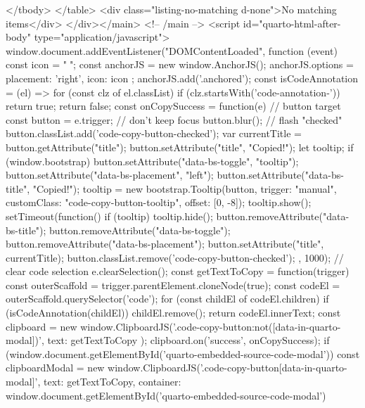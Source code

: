 </tbody>
</table>
<div class="listing-no-matching d-none">No matching items</div>
</div></main> <!-- /main -->
<script id="quarto-html-after-body" type="application/javascript">
  window.document.addEventListener("DOMContentLoaded", function (event) {
    const icon = "";
    const anchorJS = new window.AnchorJS();
    anchorJS.options = {
      placement: 'right',
      icon: icon
    };
    anchorJS.add('.anchored');
    const isCodeAnnotation = (el) => {
      for (const clz of el.classList) {
        if (clz.startsWith('code-annotation-')) {                     
          return true;
        }
      }
      return false;
    }
    const onCopySuccess = function(e) {
      // button target
      const button = e.trigger;
      // don't keep focus
      button.blur();
      // flash "checked"
      button.classList.add('code-copy-button-checked');
      var currentTitle = button.getAttribute("title");
      button.setAttribute("title", "Copied!");
      let tooltip;
      if (window.bootstrap) {
        button.setAttribute("data-bs-toggle", "tooltip");
        button.setAttribute("data-bs-placement", "left");
        button.setAttribute("data-bs-title", "Copied!");
        tooltip = new bootstrap.Tooltip(button, 
          { trigger: "manual", 
            customClass: "code-copy-button-tooltip",
            offset: [0, -8]});
        tooltip.show();    
      }
      setTimeout(function() {
        if (tooltip) {
          tooltip.hide();
          button.removeAttribute("data-bs-title");
          button.removeAttribute("data-bs-toggle");
          button.removeAttribute("data-bs-placement");
        }
        button.setAttribute("title", currentTitle);
        button.classList.remove('code-copy-button-checked');
      }, 1000);
      // clear code selection
      e.clearSelection();
    }
    const getTextToCopy = function(trigger) {
      const outerScaffold = trigger.parentElement.cloneNode(true);
      const codeEl = outerScaffold.querySelector('code');
      for (const childEl of codeEl.children) {
        if (isCodeAnnotation(childEl)) {
          childEl.remove();
        }
      }
      return codeEl.innerText;
    }
    const clipboard = new window.ClipboardJS('.code-copy-button:not([data-in-quarto-modal])', {
      text: getTextToCopy
    });
    clipboard.on('success', onCopySuccess);
    if (window.document.getElementById('quarto-embedded-source-code-modal')) {
      const clipboardModal = new window.ClipboardJS('.code-copy-button[data-in-quarto-modal]', {
        text: getTextToCopy,
        container: window.document.getElementById('quarto-embedded-source-code-modal')
}}}
